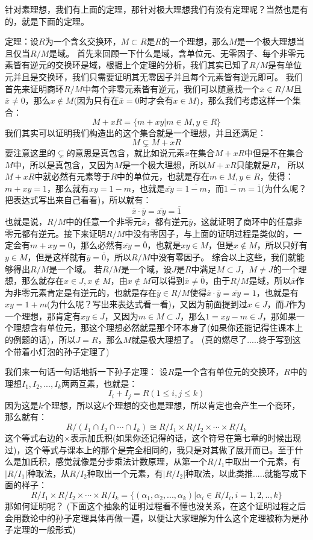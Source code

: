 \documentclass[12pt, a4paper, oneside]{ctexart}
\begin{document}
针对素理想，我们有上面的定理，那针对极大理想我们有没有定理呢？当然也是有的，就是下面的定理。

定理：设$R$为一个含幺交换环，$M\subset R$是$R$的一个理想，那么$M$是一个极大理想当且仅当$R/M$是域。
首先来回顾一下什么是域，含单位元、无零因子、每个非零元素皆有逆元的交换环是域，根据上个定理的分析，我们其实已知了$R/M$是有单位元并且是交换环，我们只需要证明其无零因子并且每个元素皆有逆元即可。
我们首先来证明商环$R/M$中每个非零元素皆有逆元，我们可以随意找一个$\overline{x}\in R/M$且$\overline{x}\neq 0$，那么$x\notin M$(因为只有在$\overline{x}=0$时才会有$x\in M$)，那么我们考虑这样一个集合：
\[
M+xR=\{m+xy|m\in M,y\in R\}
\]
我们其实可以证明我们构造出的这个集合就是一个理想，并且还满足：
\[
M\subsetneq M+xR
\]
要注意这里的$\subsetneq$的意思是真包含，就比如说元素$x$在集合$M+xR$中但是不在集合$M$中，所以是真包含，又因为$M$是一个极大理想，所以$M+xR$只能就是$R$，
所以$M+xR$中就必然有元素等于$R$中的单位元，也就是存在$m\in M,y\in R$，使得：$m+xy=1$，那么就有$xy=1-m$，也就是$\overline{xy}=\overline{1-m}$，而$\overline{1-m}=\overline{1}$(为什么呢？把表达式写出来自己看看)，所以就有：
\[
\overline{x}\cdot\overline{y}=\overline{xy}=\overline{1}
\]
也就是说，$R/M$中的任意一个非零元$\overline{x}$，都有逆元$\overline{y}$，这就证明了商环中的任意非零元都有逆元。接下来证明$R/M$中没有零因子，与上面的证明过程是类似的，一定会有$m+xy=0$，那么必然有$\overline{xy}=\overline{0}$，也就是$xy\in M$，但是$x\notin M$，所以只好有$y\in M$，但是这样就有$\overline{y}=\overline{0}$，所以$R/M$中没有零因子。
综合以上这些，我们就能够得出$R/M$是一个域。
若$R/M$是一个域，设$J$是$R$中满足$M\subset J，M\neq J$的一个理想，那么就存在$x\in J,x\notin M$，由$x\notin M$可以得到$\overline{x}\neq \overline{0}$，由于$R/M$是域，所以$\overline{x}$作为非零元素肯定是有逆元的，也就是存在$\overline{y}\in R/M$使得$\overline{x}\cdot\overline{y}=\overline{xy}=1$，也就是有$xy=1+m$(为什么呢？写出来表达式看一看)，又因为前面提到过$x\in J$，而$J$作为一个理想，那肯定有$xy\in J$，又因为$m\in M\subset J$，那么$1=xy-m\in J$，那如果一个理想含有单位元，那这个理想必然就是那个环本身了(如果你还能记得住课本上的例题的话)，所以$J=R$，那么$M$就是极大理想了。
(真的燃尽了.....终于写到这个带着小灯泡的孙子定理了)

我们来一句话一句话地拆一下孙子定理：
设$R$是一个含有单位元的交换环，$R$中的理想$I_1,I_2,...,I_k$两两互素，也就是：
\[
I_i+I_j=R(1\leqslant i,j\leqslant k)
\]
因为这是$k$个理想，所以这$k$个理想的交也是理想，所以肯定也会产生一个商环，那么就有：
\[
{R}/(I_1\cap I_2\cap \cdots\cap I_k )\cong {R}/{I_1}\times{R}/{I_2}\times\cdots\times{R}/{I_k}
\]
这个等式右边的$\times$表示加氏积(如果你还记得的话，这个符号在第七章的时候出现过)，这个等式与课本上的那个是完全相同的，我只是对其做了展开而已。至于什么是加氏积，感觉就像是分步乘法计数原理，从第一个${R}/{I_1}$中取出一个元素，有$|{R}/{I_1}|$种取法，从${R}/{I_2}$种取出一个元素，有$|{R}/{I_2}|$种取法，以此类推.....就能写成下面的样子：
\[
{R}/{I_1}\times{R}/{I_2}\times\cdots\times{R}/{I_k}=\{(\alpha_1,\alpha_2,...,\alpha_k)|\alpha_i\in R/I_i,i=1,2,..,k\}
\]
那如何证明呢？
(下面这个抽象的证明过程看不懂也没关系，在这个证明过程之后会用数论中的孙子定理具体再做一遍，以便让大家理解为什么这个定理被称为是孙子定理的一般形式)
\end{document}
